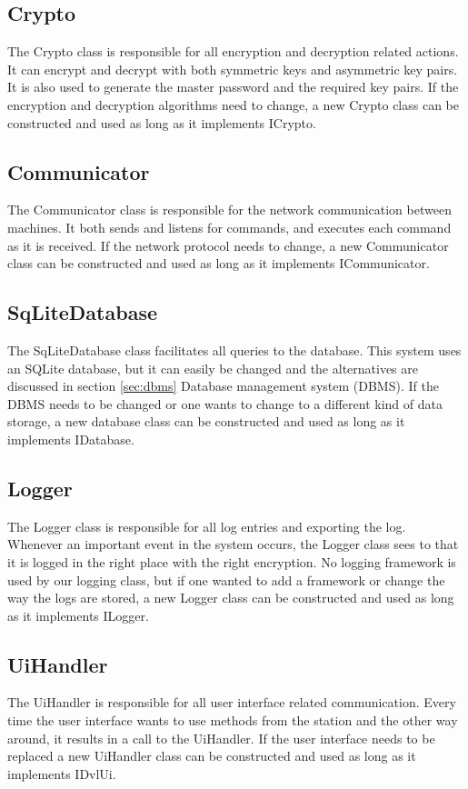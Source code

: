 \documentclass[a4paper]{report}
\begin{document}
\subsection{Crypto}
The Crypto class is responsible for all encryption and decryption related actions. It can encrypt and decrypt with both symmetric keys and asymmetric key pairs. It is also used to generate the master password and the required key pairs. If the encryption and decryption algorithms need to change, a new Crypto class can be constructed and used as long as it implements ICrypto.

\subsection{Communicator}
The Communicator class is responsible for the network communication between machines. It both sends and listens for commands, and executes each command as it is received. If the network protocol needs to change, a new Communicator class can be constructed and used as long as it implements ICommunicator.

\subsection{SqLiteDatabase}
The SqLiteDatabase class facilitates all queries to the database. This system uses an SQLite database, but it can easily be changed and the alternatives are discussed in section \ref{sec:dbms} Database management system (DBMS). If the DBMS needs to be changed or one wants to change to a different kind of data storage, a new database class can be constructed and used as long as it implements IDatabase.

\subsection{Logger}
The Logger class is responsible for all log entries and exporting the log. Whenever an important event in the system occurs, the Logger class sees to that it is logged in the right place with the right encryption. No logging framework is used by our logging class, but if one wanted to add a framework or change the way the logs are stored, a new Logger class can be constructed and used as long as it implements ILogger.

\subsection{UiHandler}
The UiHandler is responsible for all user interface related communication. Every time the user interface wants to use methods from the station and the other way around, it results in a call to the UiHandler. If the user interface needs to be replaced a new UiHandler class can be constructed and used as long as it implements IDvlUi.
\end{document}
